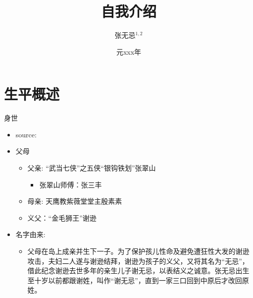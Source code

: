 \documentclass[t]{beamer}
\author{张无忌$^{1,2}$}
\institute{
$^{1}$ 明教 \\
$^{2}$University of Chinese Academy of Sciences, Beijing, China \\
}
\date{元xxx年}
\title{自我介绍}
\begin{document}
\titlepage
    
\section{生平概述}
\begin{frame}{身世}
    \begin{itemize}
        \item source: \cite{金庸2010倚天屠龙记后记} 
        \item 父母
            \begin{itemize}
                \item 父亲: “武当七侠”之五侠“银钩铁划”张翠山
                    \begin{itemize}
                        \item 张翠山师傅：张三丰
                    \end{itemize}
                \item 母亲: 天鹰教紫薇堂堂主殷素素
                \item 义父：“金毛狮王”谢逊
            \end{itemize}

        \item 名字由来: 
            \begin{itemize}
                \item 父母在岛上成亲并生下一子。为了保护孩儿性命及避免遭狂性大发的谢逊攻击，夫妇二人遂与谢逊结拜，谢逊为孩子的义父，又将其名为“无忌”，借此纪念谢逊去世多年的亲生儿子谢无忌，以表结义之诚意。张无忌出生至十岁以前都跟谢姓，叫作“谢无忌”，直到一家三口回到中原后才改回原姓。
            \end{itemize}
    \end{itemize}
\end{frame}

\qapage

\end{document}
